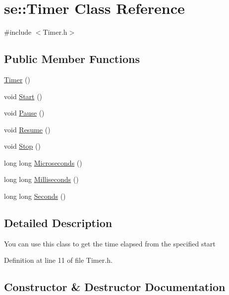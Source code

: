 \hypertarget{classse_1_1_timer}{}\section{se\+:\+:Timer Class Reference}
\label{classse_1_1_timer}


{\ttfamily \#include $<$Timer.\+h$>$}

\subsection*{Public Member Functions}
\begin{DoxyCompactItemize}
\item 
\mbox{\hyperlink{classse_1_1_timer_a0f3bf62bd9419c252910191f13669dd7}{Timer}} ()
\item 
void \mbox{\hyperlink{classse_1_1_timer_a0294f5629a28a1e169a8d1b5ab179273}{Start}} ()
\item 
void \mbox{\hyperlink{classse_1_1_timer_abde91d5d6e7fe0601c0c9607193707d8}{Pause}} ()
\item 
void \mbox{\hyperlink{classse_1_1_timer_a432406f463e02336c1033d65ae1d746e}{Resume}} ()
\item 
void \mbox{\hyperlink{classse_1_1_timer_aed6b34f75ec989731c80fefe962493f3}{Stop}} ()
\item 
long long \mbox{\hyperlink{classse_1_1_timer_a7fdf38aafc8be894fc25764ff8cabb36}{Microseconds}} ()
\item 
long long \mbox{\hyperlink{classse_1_1_timer_a9c3fe064b6637f2804c370da786a38d8}{Milliseconds}} ()
\item 
long long \mbox{\hyperlink{classse_1_1_timer_a258761c48271338588503d8170532bde}{Seconds}} ()
\end{DoxyCompactItemize}


\subsection{Detailed Description}
You can use this class to get the time elapsed from the specified start 

Definition at line 11 of file Timer.\+h.



\subsection{Constructor \& Destructor Documentation}
\mbox{\label{classse_1_1_timer_a0f3bf62bd9419c252910191f13669dd7}} 
